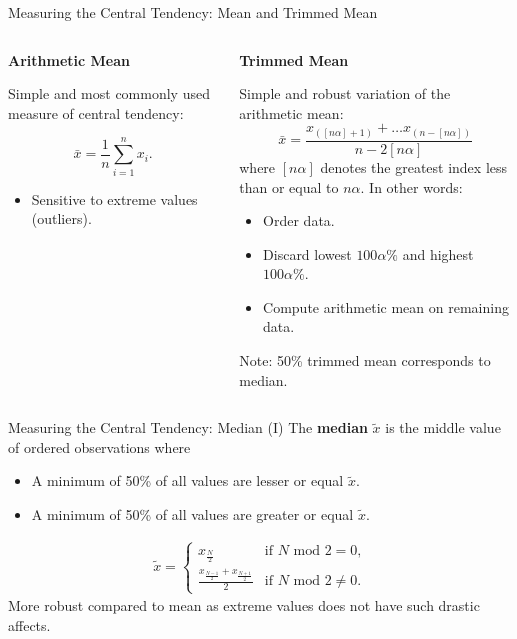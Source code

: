 \begin{frame}{Measuring the Central Tendency: Mean and Trimmed Mean}
	\begin{columns}
		\begin{column}{0.5\textwidth}
			\textbf{Arithmetic Mean}

			Simple and most commonly used measure of central tendency:

			\begin{equation*}
				\bar{x} = \frac{1}{n} \sum_{i=1}^{n} x_i.
			\end{equation*}

			\begin{itemize}
				\item Sensitive to extreme values (outliers).
			\end{itemize}
		\end{column}
		\begin{column}{0.5\textwidth}
			\textbf{Trimmed Mean}

			Simple and robust variation of the arithmetic mean:
			\begin{equation*}
				\bar{x} = \frac{x_{([n\alpha]+1)}+ \dots x_{(n-[n\alpha])}}{n-2[n\alpha]}
			\end{equation*}
			where $[n\alpha]$ denotes the greatest index less than or equal to $n\alpha$. In other words:

			\begin{itemize}
				\item Order data.
				\item Discard lowest $100\alpha\%$ and highest $100\alpha\%$.
				\item Compute arithmetic mean on remaining data.
			\end{itemize}


			Note: 50\% trimmed mean corresponds to median.
		\end{column}
	\end{columns}
\end{frame}

\begin{frame}{Measuring the Central Tendency: Median (I)}
	The \textbf{median} $\tilde{x}$ is the middle value of ordered observations where
	\begin{itemize}
		\item A minimum of 50\% of all values are lesser or equal $\tilde{x}$.
		\item A minimum of 50\% of all values are greater or equal $\tilde{x}$.
	\end{itemize}

	\begin{align*}
		\tilde{x} = %
		\begin{cases}
			x_{\frac{N}{2}}                               & \text{if $N$ mod $2 = 0$,}    \\
			\frac{x_{\frac{N-1}{2}}+x_{\frac{N+1}{2}}}{2} & \text{if $N$ mod $2 \neq 0$.}
		\end{cases}
	\end{align*}
	More robust compared to mean as extreme values does not have such drastic affects.
\end{frame}

